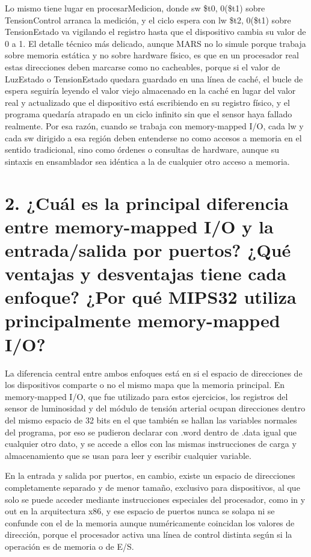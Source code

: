 \documentclass[12pt, letterpaper]{article}
\begin{document}
Lo mismo tiene lugar en procesarMedicion, donde sw \$t0, 0(\$t1) sobre TensionControl arranca la medición, y el ciclo espera con lw \$t2, 0(\$t1) sobre TensionEstado va vigilando el registro hasta que el dispositivo cambia su valor de 0 a 1. El detalle técnico más delicado, aunque MARS no lo simule porque trabaja sobre memoria estática y no sobre hardware físico, es que en un procesador real estas direcciones deben marcarse como no cacheables, porque si el valor de LuzEstado o TensionEstado quedara guardado en una línea de caché, el bucle de espera seguiría leyendo el valor viejo almacenado en la caché en lugar del valor real y actualizado que el dispositivo está escribiendo en su registro físico, y el programa quedaría atrapado en un ciclo infinito sin que el sensor haya fallado realmente. Por esa razón, cuando se trabaja con memory-mapped I/O, cada lw y cada sw dirigido a esa región deben entenderse no como accesos a memoria en el sentido tradicional, sino como órdenes o consultas de hardware, aunque su sintaxis en ensamblador sea idéntica a la de cualquier otro acceso a memoria.
\newpage

\section*{\textbf{2. ¿Cuál es la principal diferencia entre memory-mapped I/O y la entrada/salida por puertos? ¿Qué ventajas y desventajas tiene cada enfoque? ¿Por qué MIPS32 utiliza principalmente memory-mapped I/O?}}

La diferencia central entre ambos enfoques está en si el espacio de direcciones de los dispositivos comparte o no el mismo mapa que la memoria principal. En memory-mapped I/O, que fue utilizado para estos ejercicios, los registros del sensor de luminosidad y del módulo de tensión arterial ocupan direcciones dentro del mismo espacio de 32 bits en el que también se hallan las variables normales del programa, por eso se pudieron declarar con .word dentro de .data igual que cualquier otro dato, y se accede a ellos con las mismas instrucciones de carga y almacenamiento que se usan para leer y escribir cualquier variable.

En la entrada y salida por puertos, en cambio, existe un espacio de direcciones completamente separado y de menor tamaño, exclusivo para dispositivos, al que solo se puede acceder mediante instrucciones especiales del procesador, como in y out en la arquitectura x86, y ese espacio de puertos nunca se solapa ni se confunde con el de la memoria aunque numéricamente coincidan los valores de dirección, porque el procesador activa una línea de control distinta según si la operación es de memoria o de E/S.
\end{document}
